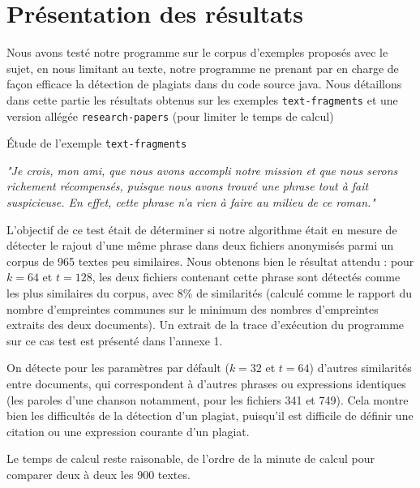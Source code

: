 \documentclass[a4paper,twoside,12pt]{article}
\newcounter{partie}
\newcounter{sous-partie}
\newenvironment{partie}[1]
{
\section{#1}
}
{

}
\newenvironment{sous-partie}[1]
{
\subsection{#1}
}
{

}
\begin{document}
\begin{partie}{Présentation des résultats}

Nous avons testé notre programme sur le corpus d'exemples proposés avec le sujet, en nous limitant au texte, notre programme ne prenant par en charge de façon efficace la détection de plagiats dans du code source java. Nous détaillons dans cette partie les résultats obtenus sur les exemples \texttt{text-fragments} et une version allégée \texttt{research-papers} (pour limiter le temps de calcul)

\begin{sous-partie}{Étude de l'exemple \texttt{text-fragments}}

\begin{paragraph}{}
\textit{"Je crois, mon ami, que nous avons accompli notre mission et que nous serons richement récompensés, puisque nous avons trouvé une phrase tout à fait suspicieuse. En effet, cette phrase n'a rien à faire au milieu de ce roman."}
\end{paragraph}
\begin{paragraph}{}
L'objectif de ce test était de déterminer si notre algorithme était en mesure de détecter le rajout d'une même phrase dans deux fichiers anonymisés parmi un corpus de 965 textes peu similaires. Nous obtenons bien le résultat attendu : pour $k=64$ et $t=128$, les deux fichiers contenant cette phrase sont détectés comme les plus similaires du corpus, avec 8\% de similarités (calculé comme le rapport du nombre d'empreintes communes sur le minimum des nombres d'empreintes extraits des deux documents). Un extrait de la trace d'exécution du programme sur ce cas test est présenté dans l'annexe 1.
\end{paragraph}

\begin{paragraph}{}
On détecte pour les paramètres par défault ($k = 32$ et $t=64$) d'autres similarités entre documents, qui correspondent à d'autres phrases ou expressions identiques (les paroles d'une chanson notamment, pour les fichiers 341 et 749). Cela montre bien les difficultés de la détection d'un plagiat, puisqu'il est difficile de définir une citation ou une expression courante d'un plagiat.
\end{paragraph}

\begin{paragraph}{}
Le temps de calcul reste raisonable, de l'ordre de la minute de calcul pour comparer deux à deux les 900 textes.
\end{paragraph}


\end{sous-partie}
\end{partie}
\end{document}
